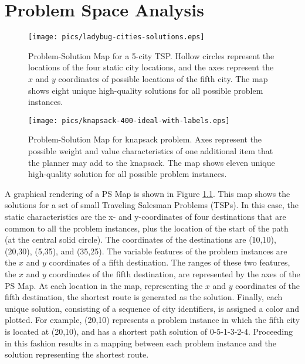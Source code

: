\chapter{Problem Space Analysis}
\thispagestyle{plain}

\label{ch:psa-utilization}

\begin{figure}
\centering
\texttt{[image: pics/ladybug-cities-solutions.eps]}
\caption{Problem-Solution Map for a 5-city TSP.  Hollow circles represent the locations of the four static city locations, and the axes represent the $x$ and $y$ coordinates of possible locations of the fifth city.  The map shows eight unique high-quality solutions for all possible problem instances.}
\label{fig:ps-map-ladybug-marked-cities}
\end{figure}

\begin{figure}
\centering
\texttt{[image: pics/knapsack-400-ideal-with-labels.eps]}
\caption{Problem-Solution Map for knapsack problem.  Axes represent the possible weight and value characteristics of one additional item that the planner may add to the knapsack.  The map shows eleven unique high-quality solution for all possible problem instances.}
\label{fig:ps-map-knapsack}
\end{figure}

A graphical rendering of a PS Map is shown in Figure \ref{fig:ps-map-ladybug-marked-cities}.  This map shows the solutions for a set of small Traveling Salesman Problems (TSPs). In this case, the static characteristics are the x- and y-coordinates of four destinations that are common to all the problem instances, plus the location of the start of the path (at the central solid circle).  The coordinates of the destinations are (10,10), (20,30), (5,35), and (35,25). The variable features of the problem instances are the $x$ and $y$ coordinates of a fifth destination.  The ranges of these two features, the $x$ and $y$ coordinates of the fifth destination, are represented by the  axes of the PS Map.  At each location in the map, representing the $x$ and $y$ coordinates of the fifth destination, the shortest route is generated as the solution.  Finally, each unique solution, consisting of a sequence of city identifiers, is assigned a color and plotted.  For example, (20,10) represents a problem instance in which the fifth city is located at (20,10), and has a shortest path solution of 0-5-1-3-2-4.  Proceeding in this fashion results in a mapping between each problem instance and the solution representing the shortest route.

